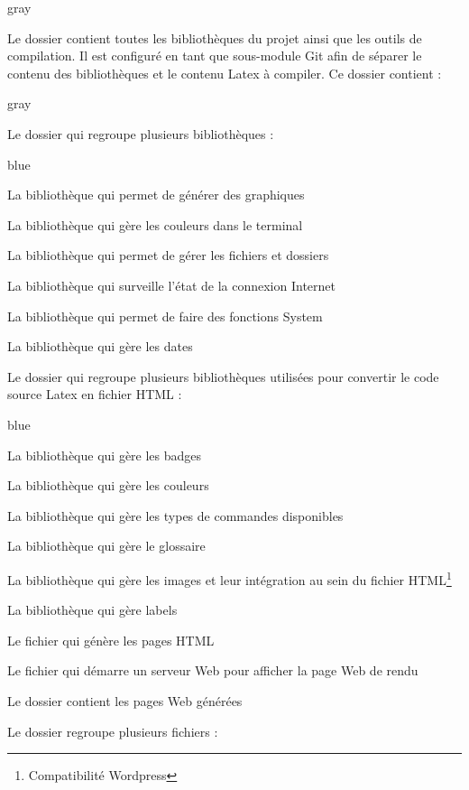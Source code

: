 \begin{items}{gray}{\faFolder}
    \item Le dossier  contient toutes les bibliothèques du projet ainsi que les outils de compilation. 
    Il est configuré en tant que sous-module Git afin de séparer le contenu des bibliothèques et le contenu Latex à compiler.
    Ce dossier contient :
    \begin{items}{gray}{\faFolder}

        \item Le dossier  qui regroupe plusieurs bibliothèques : 

        \begin{items}{blue}{}
            \item La bibliothèque  qui permet de générer des graphiques
            \item La bibliothèque  qui gère les couleurs dans le terminal
            \item La bibliothèque  qui permet de gérer les fichiers et dossiers
            \item La bibliothèque  qui surveille l'état de la connexion Internet
            \item La bibliothèque  qui permet de faire des fonctions System
            \item La bibliothèque  qui gère les dates
        \end{items}

        \item Le dossier  qui regroupe plusieurs bibliothèques utilisées pour convertir le code source Latex en fichier HTML : 

        \begin{items}{blue}{}
            \item La bibliothèque  qui gère les badges
            \item La bibliothèque  qui gère les couleurs
            \item La bibliothèque  qui gère les types de commandes disponibles
            \item La bibliothèque  qui gère le glossaire
            \item La bibliothèque  qui gère les images et leur intégration au sein du fichier HTML\footnote{Compatibilité Wordpress}
            \item La bibliothèque  qui gère labels
            \item Le fichier  qui génère les pages HTML
            \item Le fichier  qui démarre un serveur Web pour afficher la page Web de rendu
            \item Le dossier  contient les pages Web générées
        \end{items}
        \item Le dossier  regroupe plusieurs fichiers : 


\end{items}
\end{items}

